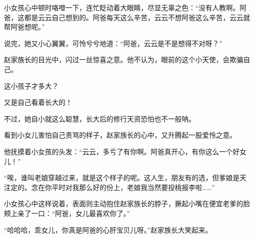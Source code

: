 \begin{this_body}
小女孩心中顿时咯噔一下，连忙眨动着大眼睛，尽显无辜之色：“没有人教啊。阿爸，这都是云云自己想到的。阿爸每天这么辛苦，云云不想阿爸这么辛苦，云云就帮阿爸想呢。”

说完，她又小心翼翼，可怜兮兮地道：“阿爸，云云是不是想得不对呀？”

赵家族长的目光中，闪过一丝惊喜之意。他不认为，眼前的这个小天使，会欺骗自己。

这小孩子才多大？

又是自己看着长大的！

不过，她自小就这么聪慧，长大后的修行天资恐怕也不一般呐。

看到小女儿害怕自己责骂的样子，赵家族长的心中，又升腾起一股爱怜之意。

他抚摸着小女孩的头发：“云云，多亏了有你啊。阿爸真开心，有你这么一个好女儿！”

“唉，谁叫老娘穿越过来，就是这个样子的呢。这人生，朋友有的选，但爹娘是天注定的。念在你平时对我那么好的份上，老娘我当然要投桃报李啦……”

小女孩心中这样说着，表面则主动抱住赵家族长的脖子，撅起小嘴在便宜老爹的脸颊上亲了一口：“阿爸，女儿最喜欢你了。”

“哈哈哈，乖女儿，你真是阿爸的心肝宝贝儿呀。”赵家族长大笑起来。

\end{this_body}

